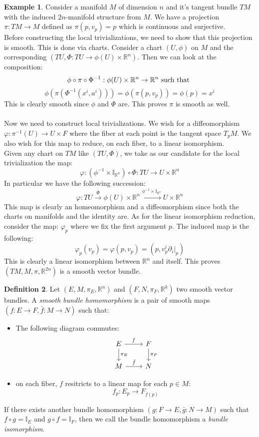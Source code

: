 \documentclass[12pt,a4paper]{report}
\theoremstyle{definition}
\newtheorem{Def}{Definition}[chapter]
\theoremstyle{Theorem}
\theoremstyle{definition}
\newtheorem{Ex}[Def]{Example}
\theoremstyle{definition}
\begin{document}
	\begin{Ex}
		Consider a manifold $M$ of dimension $n$ and it's tangent bundle $TM$ with the induced $2n$-manifold structure from $M$. We have a projection $\pi:TM\rightarrow M$ defined as $\pi(p,v_p)=p$ which is continuous and surjective. 
		\\
		Before constructing the local trivializations, we need to show that this projection is smooth. This is done via charts. Consider a chart $(U,\phi)$ on $M$ and the corresponding $(TU,\Phi:TU\rightarrow \phi(U)\times \mathbb{R}^n)$. Then we can look at the composition:
		$$\phi\circ \pi\circ \Phi^{-1}:\phi(U)\times \mathbb{R}^n\rightarrow \mathbb{R}^n \hbox{ such that }$$ 
		$$\phi(\pi(\Phi^{-1}(x^i,a^i)))=\phi(\pi(p,v_p))=\phi(p)=x^i$$
		This is clearly smooth since $\phi$ and $\Phi$ are. This proves $\pi$ is smooth as well.\\
		\\
		Now we need to construct local trivializations. We wish for a diffeomorphism $\varphi:\pi^{-1}(U)\rightarrow U\times F$ where the fiber at each point is the tangent space $T_pM$. We also wish for this map to reduce, on each fiber, to a linear isomorphism.\\
		Given any chart on $TM$ like $(TU,\Phi)$, we take as our candidate for the local trivialization the map: 
		$$\varphi:(\phi^{-1}\times \mathbb{I}_{\mathbb{R}^n})\circ \Phi:TU\rightarrow U\times \mathbb{R}^n$$
		In particular we have the following succession:
		$$\varphi:TU\xrightarrow{\text{$\Phi$}} \phi(U)\times \mathbb{R}^n\xrightarrow{\text{$\phi^{-1}\times \mathbb{I}_{\mathbb{R}^n}$}}U\times \mathbb{R}^n$$
		This map is clearly an homeomorphism and a diffeomorphism since both the charts on manifolds and the identity are. As for the linear isomorphism reduction, consider the map:
		$\varphi_p$ where we fix the first argument $p$. The induced map is the following:
		$$\varphi_p(v_p)=\varphi(p,v_p)=(p,v^i_p\partial_i|_p)$$
		This is clearly a linear isomorphism between $\mathbb{R}^n$ and itself. This proves $(TM,M,\pi,\mathbb{R}^{2n})$ is a smooth vector bundle.
	\end{Ex}
	\begin{Def}
		Let $(E,M,\pi_E,\mathbb{R}^n)$ and $(F,N,\pi_F,\mathbb{R}^k)$ two smooth vector bundles. A \textit{smooth bundle homomorphism} is a pair of smooth maps $(f:E\rightarrow F,\bar{f}:M\rightarrow N)$ such that:
		\begin{itemize}
			\item The following diagram commutes:
			\[
			\begin{tikzcd}
				E \arrow{r}{f} \arrow{d}{\pi_E} & F \arrow{d}{\pi_F}\\
				M \arrow{r}{\bar{f}}&N 
			\end{tikzcd}
			\]
			\item on each fiber, $f$ resitricts to a linear map for each $p\in M$:
			$$f_p:E_p\rightarrow
			F_{\bar{f}(p)}$$
		\end{itemize} 
		If there exists another bundle homomorphism $(g:F\rightarrow E,\bar{g}:N\rightarrow M)$ such that
		$f\circ g=\mathbb{I}_E$ and $g\circ f=\mathbb{I}_F$, then we call the bundle homomorphism a \textit{bundle isomorphism}.
	\end{Def}
\end{document}

